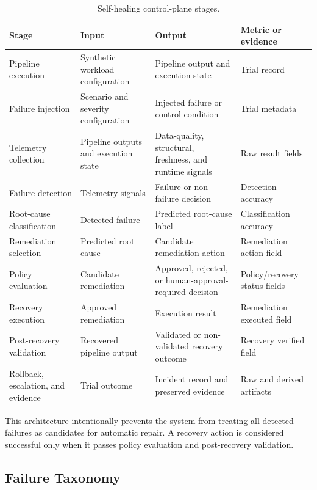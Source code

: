 \begin{table}[t]
\caption{Self-healing control-plane stages.}
\label{tab:methodology-1}
\centering
\scriptsize
\begin{tabularx}{\linewidth}{@{}>{\raggedright\arraybackslash}X>{\raggedright\arraybackslash}X>{\raggedright\arraybackslash}X>{\raggedright\arraybackslash}X@{}}
\toprule
\textbf{Stage} & \textbf{Input} & \textbf{Output} & \textbf{Metric or evidence} \\
\midrule
Pipeline execution & Synthetic workload configuration & Pipeline output and execution state & Trial record \\
Failure injection & Scenario and severity configuration & Injected failure or control condition & Trial metadata \\
Telemetry collection & Pipeline outputs and execution state & Data-quality, structural, freshness, and runtime signals & Raw result fields \\
Failure detection & Telemetry signals & Failure or non-failure decision & Detection accuracy \\
Root-cause classification & Detected failure & Predicted root-cause label & Classification accuracy \\
Remediation selection & Predicted root cause & Candidate remediation action & Remediation action field \\
Policy evaluation & Candidate remediation & Approved, rejected, or human-approval-required decision & Policy/recovery status fields \\
Recovery execution & Approved remediation & Execution result & Remediation executed field \\
Post-recovery validation & Recovered pipeline output & Validated or non-validated recovery outcome & Recovery verified field \\
Rollback, escalation, and evidence & Trial outcome & Incident record and preserved evidence & Raw and derived artifacts \\
\bottomrule
\end{tabularx}
\end{table}


This architecture intentionally prevents the system from treating all detected failures as candidates for automatic repair. A recovery action is considered successful only when it passes policy evaluation and post-recovery validation.

\subsection{Failure Taxonomy}


